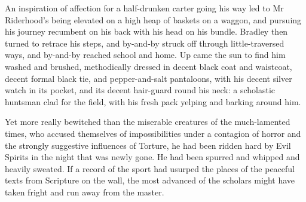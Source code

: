 An inspiration of affection for a half-drunken carter going his way led
to Mr Riderhood’s being elevated on a high heap of baskets on a waggon,
and pursuing his journey recumbent on his back with his head on his
bundle. Bradley then turned to retrace his steps, and by-and-by struck
off through little-traversed ways, and by-and-by reached school and
home. Up came the sun to find him washed and brushed, methodically
dressed in decent black coat and waistcoat, decent formal black tie, and
pepper-and-salt pantaloons, with his decent silver watch in its pocket,
and its decent hair-guard round his neck: a scholastic huntsman clad for
the field, with his fresh pack yelping and barking around him.

Yet more really bewitched than the miserable creatures of the
much-lamented times, who accused themselves of impossibilities under a
contagion of horror and the strongly suggestive influences of Torture,
he had been ridden hard by Evil Spirits in the night that was newly
gone. He had been spurred and whipped and heavily sweated. If a record
of the sport had usurped the places of the peaceful texts from Scripture
on the wall, the most advanced of the scholars might have taken fright
and run away from the master.




